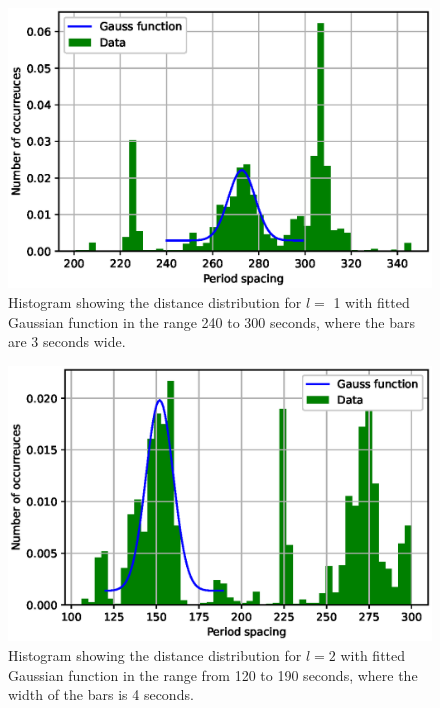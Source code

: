 \documentclass{aa}
\begin{document}
\begin{figure}[h]
    \centering
    \includegraphics[scale=1]{images/histogram_l1_gauss.eps}
    \caption{Histogram showing the distance distribution for $ l = $ 1 with fitted Gaussian function in the range 240 to 300 seconds, where the bars are 3 seconds wide.}
    \label{fig:my_label_6}
\end{figure}

\begin{figure}[h]
    \centering
    \includegraphics[scale=1]{images/histogram_l2_gauss.eps}
    \caption{Histogram showing the distance distribution for $ l = 2$  with fitted Gaussian function in the range from 120 to 190 seconds, where the width of the bars is 4 seconds.}
    \label{fig:my_label_7}
\end{figure}
\end{document}
